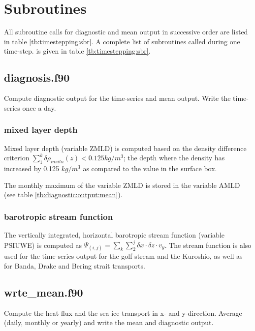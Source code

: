 \section[Subroutines]
{\Large{\bf Subroutines}}
\label{sec:diagnostic:subroutines}

All subroutine calls for diagnostic and mean output in successive order 
are listed in table \ref{tb:timestepping:sbr}. 
A complete list of subroutines called during one time-step.
is given in table \ref{tb:timestepping:sbr}. 

\subsection{diagnosis.f90}
\label{sec:diagnostic:subroutines:diagnosis}
Compute diagnostic output for the time-series and mean output.
Write the time-series once a day.

\subsubsection{mixed layer depth}

Mixed layer depth (variable ZMLD) is computed based on the density difference criterion
$\sum_{1}^{k}\delta\rho_{insitu}(z) < 0.125 kg/m^3$;
the depth where the density has 
increased by 0.125 $kg/m^3$ as compared to the value in the surface box.

The monthly maximum of the variable ZMLD is stored in the variable AMLD (see table \ref{tb:diagnostic:output:mean}).

\subsubsection{barotropic stream function}

The vertically integrated, horizontal barotropic stream function (variable PSIUWE)
is computed as
$\Psi_{(i,j)} = \sum_{k} \sum_{2}^{j} \delta x \cdot \delta z \cdot v_y  $.
The stream function is also used for the time-series output for the golf stream and the Kuroshio,
as well as for Banda, Drake and Bering strait transports.

\subsection{wrte\_mean.f90}
\label{sec:diagnostic:subroutines:wrte-mean}

Compute the heat flux and the sea ice transport in x- and y-direction.
Average (daily, monthly or yearly) and write the mean and diagnostic output.

